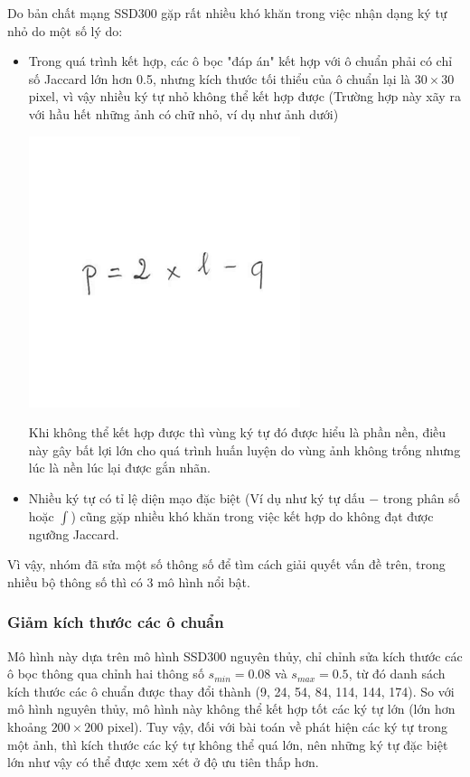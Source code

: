 \documentclass[a4paper,12pt]{article}
\begin{document}
	Do bản chất mạng SSD300 gặp rất nhiều khó khăn trong việc nhận dạng ký tự nhỏ do một số lý do:
	\begin{itemize}
		\item Trong quá trình kết hợp, các ô bọc "đáp án" kết hợp với ô chuẩn phải có chỉ số Jaccard lớn hơn 0.5, nhưng kích thước tối thiểu của ô chuẩn lại là $30 \times 30$ pixel, vì vậy nhiều ký tự nhỏ không thể kết hợp được (Trường hợp này xãy ra với hầu hết những ảnh có chữ nhỏ, ví dụ như ảnh dưới)
		\begin{center}
			\centering
			\includegraphics[resolution=300]{HMER_2017_TEST1_MINH_01_2A.png}
			\vspace{0.5cm}
		\end{center}
		Khi không thể kết hợp được thì vùng ký tự đó được hiểu là phần nền, điều này gây bất lợi lớn cho quá trình huấn luyện do vùng ảnh không trống nhưng lúc là nền lúc lại được gắn nhãn.
		
		\item Nhiều ký tự có tỉ lệ diện mạo đặc biệt (Ví dụ như ký tự dấu $-$ trong phân số hoặc $\int$) cũng gặp nhiều khó khăn trong việc kết hợp do không đạt được ngưỡng Jaccard.
	\end{itemize}
	
	Vì vậy, nhóm đã sửa một số thông số để tìm cách giải quyết vấn đề trên, trong nhiều bộ thông số thì có 3 mô hình nổi bật.
	
	\subsubsection*{Giảm kích thước các ô chuẩn}
	
	Mô hình này dựa trên mô hình SSD300 nguyên thủy, chỉ chỉnh sửa kích thước các ô bọc thông qua chỉnh hai thông số $s_{min} = 0.08$ và $s_{max} = 0.5$, từ đó danh sách kích thước các ô chuẩn được thay đổi thành (9, 24, 54, 84, 114, 144, 174). So với mô hình nguyên thủy, mô hình này không thể kết hợp tốt các ký tự lớn (lớn hơn khoảng $200 \times 200$ pixel). Tuy vậy, đối với bài toán về phát hiện các ký tự trong một ảnh, thì kích thước các ký tự không thể quá lớn, nên những ký tự đặc biệt lớn như vậy có thể được xem xét ở độ ưu tiên thấp hơn.\\
	
\end{document}
